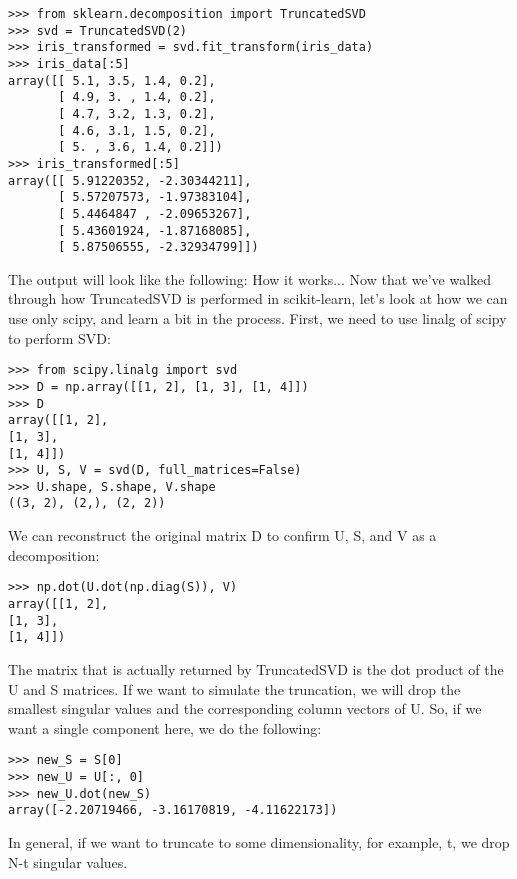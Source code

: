 \documentclass[SKL-MASTER.tex]{subfiles}
\begin{document}
\begin{framed}
\begin{verbatim}
>>> from sklearn.decomposition import TruncatedSVD
>>> svd = TruncatedSVD(2)
>>> iris_transformed = svd.fit_transform(iris_data)
>>> iris_data[:5]
array([[ 5.1, 3.5, 1.4, 0.2],
       [ 4.9, 3. , 1.4, 0.2],
       [ 4.7, 3.2, 1.3, 0.2],
       [ 4.6, 3.1, 1.5, 0.2],
       [ 5. , 3.6, 1.4, 0.2]])
>>> iris_transformed[:5]
array([[ 5.91220352, -2.30344211],
       [ 5.57207573, -1.97383104],
       [ 5.4464847 , -2.09653267],
       [ 5.43601924, -1.87168085],
       [ 5.87506555, -2.32934799]])
\end{verbatim}
\end{framed}
The output will look like the following:
How it works...
Now that we've walked through how TruncatedSVD is performed in scikit-learn, let's look at
how we can use only scipy, and learn a bit in the process.
First, we need to use linalg of scipy to perform SVD:
\begin{framed}
\begin{verbatim}
>>> from scipy.linalg import svd
>>> D = np.array([[1, 2], [1, 3], [1, 4]])
>>> D
array([[1, 2],
[1, 3],
[1, 4]])
>>> U, S, V = svd(D, full_matrices=False)
>>> U.shape, S.shape, V.shape
((3, 2), (2,), (2, 2))
\end{verbatim}
\end{framed}
We can reconstruct the original matrix D to confirm U, S, and V as a decomposition:
\begin{framed}
	\begin{verbatim}>>> np.dot(U.dot(np.diag(S)), V)
array([[1, 2],
[1, 3],
[1, 4]])
\end{verbatim}
\end{framed}
The matrix that is actually returned by TruncatedSVD is the dot product of the U and
S matrices.
If we want to simulate the truncation, we will drop the smallest singular values and
the corresponding column vectors of U. So, if we want a single component here,
we do the following:
\begin{framed}
	\begin{verbatim}>>> new_S = S[0]
>>> new_U = U[:, 0]
>>> new_U.dot(new_S)
array([-2.20719466, -3.16170819, -4.11622173])
\end{verbatim}
\end{framed}
In general, if we want to truncate to some dimensionality, for example, t, we drop N-t
singular values.
\end{document}
